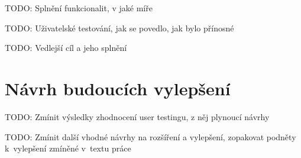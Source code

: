 TODO: Splnění funkcionalit, v jaké míře

TODO: Uživatelské testování, jak se povedlo, jak bylo přínosné

TODO: Vedlejší cíl a jeho splnění


\section*{Návrh budoucích vylepšení}

TODO: Zmínit výsledky zhodnocení user testingu, z něj plynoucí návrhy

TODO: Zmínit další vhodné návrhy na rozšíření a vylepšení, zopakovat podněty k~vylepšení zmíněné v~textu práce



































